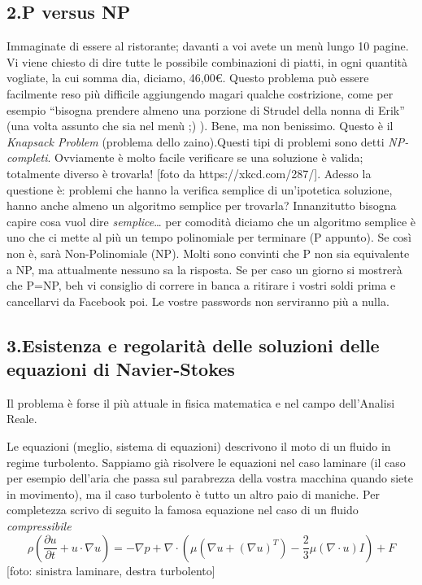 \subsection{2.P versus NP} 
Immaginate di essere al ristorante; davanti a voi avete un menù lungo 10 pagine. Vi viene chiesto di dire tutte le possibile combinazioni di piatti, in ogni quantità vogliate, la cui somma dia, diciamo, 46,00€. Questo problema può essere facilmente reso più difficile aggiungendo magari qualche costrizione, come per esempio “bisogna prendere almeno una porzione di Strudel della nonna di Erik” (una volta assunto che sia nel menù ;) ). Bene, ma non benissimo. Questo è il \emph{Knapsack Problem} (problema dello zaino).Questi tipi di problemi sono detti \emph{NP-completi}. Ovviamente è molto facile verificare se una soluzione è valida; totalmente diverso è trovarla! [foto da https://xkcd.com/287/]. Adesso la questione è: problemi che hanno la verifica semplice di un’ipotetica soluzione, hanno anche almeno un algoritmo semplice per trovarla? Innanzitutto bisogna capire cosa vuol dire \emph{semplice}… per comodità diciamo che un algoritmo semplice è uno che ci mette al più un tempo polinomiale per terminare (P appunto). Se così non è, sarà Non-Polinomiale (NP).  Molti sono convinti che P non sia equivalente a NP, ma attualmente nessuno sa la risposta. Se per caso un giorno si mostrerà che P=NP, beh vi consiglio di correre in banca a ritirare i vostri soldi prima e cancellarvi da Facebook poi. Le vostre passwords non serviranno più a nulla.
\subsection{3.Esistenza e regolarità delle soluzioni delle equazioni di Navier-Stokes}
Il problema è forse il più attuale in fisica matematica e nel campo dell’Analisi Reale. 
	
Le equazioni (meglio, sistema di equazioni) descrivono il moto di un fluido in regime turbolento. Sappiamo già risolvere le equazioni nel caso laminare (il caso per esempio dell’aria che passa sul parabrezza della vostra macchina quando siete in movimento), ma il caso turbolento è tutto un altro paio di maniche.
Per completezza scrivo di seguito la famosa equazione nel caso di un fluido \emph{compressibile} 
\[\rho \left(\frac{\partial u }{\partial t}+u\cdot \nabla u\right)=-\nabla p+\nabla\cdot (\mu(\nabla u+(\nabla u)^{T})-\frac{2}{3}\mu(\nabla\cdot u)I)+F  \]
[foto: sinistra laminare, destra turbolento]
